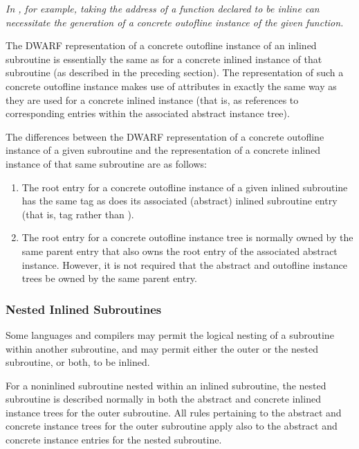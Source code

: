\textit{In , for example, 
taking the address of a function declared
to be inline can necessitate the generation of a concrete
out\dash of\dash line instance of the given function.}

The DWARF representation of a concrete out\dash of\dash line instance
of an inlined subroutine is essentially the same as for a
concrete inlined instance of that subroutine (as described in
the preceding section). The representation of such a concrete
out\dash of\dash line 
instance 
\hypertarget{chap:DWATabstractoriginoutoflineinstance}{}
makes use of 
\DWATabstractorigin{}
attributes in exactly the same way as they are used for
a concrete inlined instance (that is, as references to
corresponding entries within the associated abstract instance
tree).

The differences between the DWARF representation of a
concrete out\dash of\dash line instance of a given subroutine and the
representation of a concrete inlined instance of that same
subroutine are as follows:
\begin{enumerate}[1. ]
\item  The root entry for a concrete out\dash of\dash line instance
of a given inlined subroutine has the same tag as does its
associated (abstract) inlined subroutine entry (that is, tag
\DWTAGsubprogram{} rather than \DWTAGinlinedsubroutine).

\item The root entry for a concrete out\dash of\dash line instance tree
is normally owned by the same parent entry that also owns
the root entry of the associated abstract instance. However,
it is not required that the abstract and out\dash of\dash line instance
trees be owned by the same parent entry.

\end{enumerate}

\subsubsection{Nested Inlined Subroutines}
\label{nestedinlinedsubroutines}
Some languages and compilers may permit the logical nesting of
a subroutine within another subroutine, and may permit either
the outer or the nested subroutine, or both, to be inlined.

For a non\dash inlined subroutine nested within an inlined
subroutine, the nested subroutine is described normally in
both the abstract and concrete inlined instance trees for
the outer subroutine. All rules pertaining to the abstract
and concrete instance trees for the outer subroutine apply
also to the abstract and concrete instance entries for the
nested subroutine.

